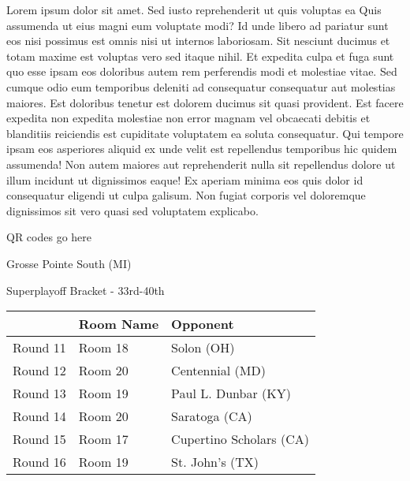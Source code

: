 \documentclass{article}%
\begin{document}
\vspace*{8pt}%
\linebreak%
\newline%
\newline%
    Lorem ipsum dolor sit amet. Sed iusto reprehenderit ut quis voluptas ea Quis assumenda ut eius magni eum voluptate modi? Id unde libero ad pariatur sunt eos nisi possimus est omnis nisi ut internos laboriosam. Sit nesciunt ducimus et totam maxime est voluptas vero sed itaque nihil. Et expedita culpa et fuga sunt quo esse ipsam eos doloribus autem rem perferendis modi et molestiae vitae.\newline%
\newline%
    Sed cumque odio eum temporibus deleniti ad consequatur consequatur aut molestias maiores. Est doloribus tenetur est dolorem ducimus sit quasi provident. Est facere expedita non expedita molestiae non error magnam vel obcaecati debitis et blanditiis reiciendis est cupiditate voluptatem ea soluta consequatur. Qui tempore ipsam eos asperiores aliquid ex unde velit est repellendus temporibus hic quidem assumenda!\newline%
\newline%
    Non autem maiores aut reprehenderit nulla sit repellendus dolore ut illum incidunt ut dignissimos eaque! Ex aperiam minima eos quis dolor id consequatur eligendi ut culpa galisum. Non fugiat corporis vel doloremque dignissimos sit vero quasi sed voluptatem explicabo.\newline%
\newline%
\vspace*{30pt}%
\begin{center}%
\begin{Huge}%
QR codes go here%
\end{Huge}%
\end{center}%
\newpage%
\begin{center}%
\begin{Huge}%
Grosse Pointe South (MI)%
\end{Huge}%
\vspace*{8pt}%
\linebreak%
\begin{Large}%
Superplayoff Bracket {-} 33rd{-}40th%
\end{Large}%
\end{center}%
%
\begin{tabularx}{\textwidth}{|c|Y|Y|}%
\hline%
&Room Name&Opponent\\%
\hline%
Round 11&Room 18&Solon (OH)\\%
Round 12&Room 20&Centennial (MD)\\%
Round 13&Room 19&Paul L. Dunbar (KY)\\%
Round 14&Room 20&Saratoga (CA)\\%
Round 15&Room 17&Cupertino Scholars (CA)\\%
Round 16&Room 19&St. John's (TX)\\%
\hline%
\end{tabularx}%
\end{document}
